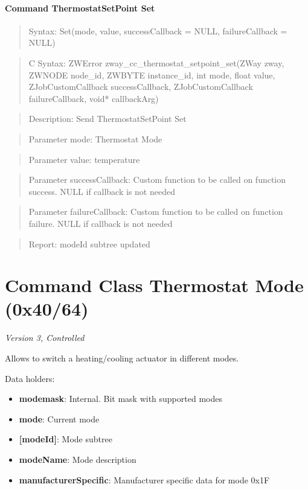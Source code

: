 \paragraph{Command ThermostatSetPoint Set}
\begin{quote}Syntax: Set(mode, value, successCallback = NULL, failureCallback = NULL)\end{quote}
\begin{quote}C Syntax: ZWError zway\_cc\_thermostat\_setpoint\_set(ZWay zway, ZWNODE node\_id, ZWBYTE instance\_id, int mode, float value, ZJobCustomCallback successCallback, ZJobCustomCallback failureCallback, void* callbackArg)\end{quote}
\begin{quote}Description: Send ThermostatSetPoint Set\end{quote}
\begin{quote}Parameter mode: Thermostat Mode\end{quote}
\begin{quote}Parameter value: temperature\end{quote}
\begin{quote}Parameter successCallback: Custom function to be called on function success. NULL if callback is not needed\end{quote}
\begin{quote}Parameter failureCallback: Custom function to be called on function failure. NULL if callback is not needed\end{quote}
\begin{quote}Report: modeId subtree updated\end{quote}


\section{Command Class Thermostat Mode (0x40/64)}

\textit{Version 3, Controlled}
\newline

Allows to switch a heating/cooling actuator in different modes.
\newline

\noindent
Data holders:

\begin{itemize}
\item \textbf{modemask}: Internal. Bit mask with supported modes
\item \textbf{mode}: Current mode
\item \textbf{[modeId]}: Mode subtree
\item \qquad\textbf{modeName}: Mode description
\item \textbf{manufacturerSpecific}: Manufacturer specific data for mode 0x1F
\end{itemize}

